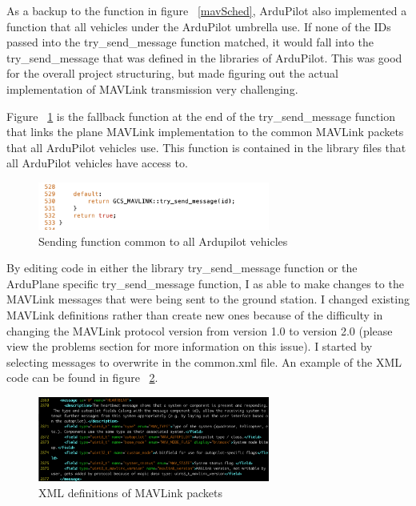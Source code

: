 \documentclass[12pt,journal,compsoc]{IEEEtran}
\begin{document}
As a backup to the function in figure ~\ref{mavSched}, ArduPilot also implemented a function that all vehicles under the ArduPilot umbrella use. If none of the IDs passed into the try\_send\_message function matched, it would fall into the try\_send\_message that was defined in the libraries of ArduPilot. This was good for the overall project structuring, but made figuring out the actual implementation of MAVLink transmission very challenging. 

Figure ~\ref{fallthrough} is the fallback function at the end of the try\_send\_message function that links the plane MAVLink implementation to the common MAVLink packets that all ArduPilot vehicles use. This function is contained in the library files that all ArduPilot vehicles have access to. 
\begin{figure}[h!]
\hspace*{0cm}
\centering
\includegraphics[width=3in]{Fallthrough.png}
\caption{Sending function common to all Ardupilot vehicles}
\label{fallthrough}
\end{figure}

By editing code in either the library try\_send\_message function or the ArduPlane specific try\_send\_message function, I as able to make changes to the MAVLink messages that were being sent to the ground station. 
I changed existing MAVLink definitions rather than create new ones because of the difficulty in changing the MAVLink protocol version from version 1.0 to version 2.0 (please view the problems section for more information on this issue). I started by selecting messages to overwrite in the common.xml file. An example of the XML code can be found in figure ~\ref{xml}.


\begin{figure}[h!]
\hspace*{0cm}
\centering
\includegraphics[width=3in]{message.png}
\caption{XML definitions of MAVLink packets}
\label{xml}
\end{figure}
\end{document}
